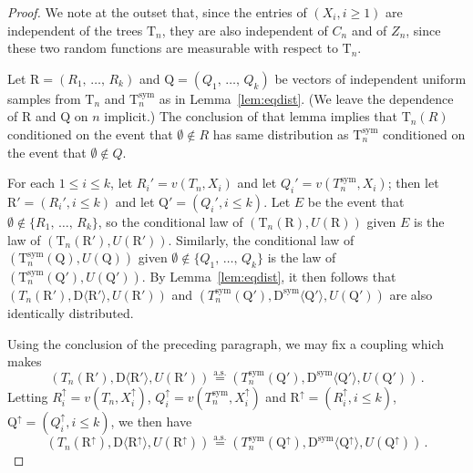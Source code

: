 \documentclass[10pt]{amsart}
\theoremstyle{definition}\newtheorem{defi}[theo]{Definition}\newtheorem{rema}[theo]{Remark}\newtheorem{exam}[theo]{Example}\newtheorem{exem}[theo]{Example}\newtheorem{nota}[theo]{Notation}
\newcommand{\rD}{\mathrm{D}}
\newcommand{\rQ}{\mathrm{Q}}
\newcommand{\rR}{\mathrm{R}}
\newcommand{\rT}{\mathrm{T}}
\DeclareMathOperator{\sym}{sym}
\newcommand{\unif}{\ensuremath{X}}
\newcommand{\angles}[1]{\langle #1 \rangle}
\newcommand{\aseq}{\ensuremath{\stackrel{\mathrm{a.s.}}{=}}}
\begin{document}
\begin{proof}
We note at the outset that, since the entries of $(X_i,i \ge 1)$ are independent of the trees $\rT_n$, they are also independent of $C_n$ and of $Z_n$, since these two random functions are measurable with respect to $\rT_n$.

Let $\rR=(R_1,\,\ldots,\,R_k)$ and $\rQ=(Q_1,\,\ldots,\,Q_k)$ be vectors of independent uniform samples from $\rT_n$ and $\rT_n^{\sym}$ as in Lemma~\ref{lem:eqdist}. (We leave the dependence of $\rR$ and $\rQ$ on $n$ implicit.) The conclusion of that lemma implies that $\rT_n(R)$ conditioned on the event that $\emptyset \notin R$ has same distribution as $\rT_n^{\sym}$ conditioned on the event that $\emptyset \notin Q$.


For each $1 \le i \le k$, let $R_i'=v(T_n,\unif_i)$ and let $Q_i' = v(T_n^{\sym},\unif_i)$; then let $\rR'=(R_i',i \le k)$ and let $\rQ'=(Q_i',i \le k)$. Let $E$ be the event that $\emptyset \not \in \{R_1,\,\ldots,\,R_k\}$, so the conditional law of $(\rT_n(\rR),U(\rR))$ given $E$ is the law of $(\rT_n(\rR'),U(\rR'))$. Similarly, the conditional law of $(\rT_n^{\sym}(\rQ),U(\rQ))$ given $\emptyset \not \in \{Q_1,\,\ldots,\,Q_k\}$ is the law of $(\rT^{\sym}_n(\rQ'),U(\rQ'))$. By Lemma~\ref{lem:eqdist}, it then follows that $(T_n(\rR'),\rD\angles{\rR'},U(\rR'))$ and $(T_n^{\sym}(\rQ'),\rD^{\sym}\angles{\rQ'},U(\rQ'))$ are also identically distributed.

Using the conclusion of the preceding paragraph, we may fix a coupling which makes
\[
\left(T_n(\rR'),\rD\angles{\rR'},U(\rR')\right)\aseq \left(T_n^{\sym}(\rQ'),\rD^{\sym}\angles{\rQ'},U(\rQ')\right)\,.
\]
Letting $R_i^\uparrow = v(T_n,\unif_i^\uparrow)$, $Q_i^\uparrow = v(T_n^{\sym},\unif_i^\uparrow)$ and $\rR^\uparrow = (R_i^\uparrow,i \le k)$, $\rQ^\uparrow = (Q_i^\uparrow,i \le k)$, we then have
\begin{equation}\label{eq:as_qr_identity}
\left(T_n\left(\rR^{\uparrow}\right),\rD\angles{\rR^{\uparrow}},U\left(\rR^{\uparrow}\right)\right)\aseq \left(T_n^{\sym}\left(\rQ^{\uparrow}\right),\rD^{\sym}\angles{\rQ^{\uparrow}},U\left(\rQ^{\uparrow}\right)\right)\,.
\end{equation}


\end{proof}
\end{document}
